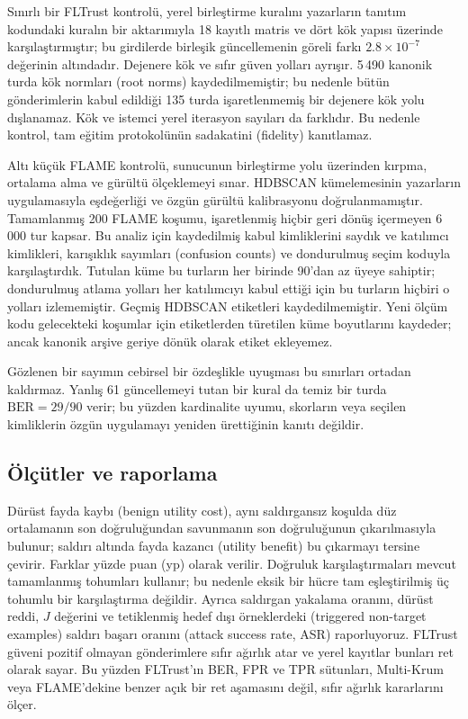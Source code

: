 \documentclass[journal]{IEEEtran}
\newcommand{\BER}{\mathrm{BER}}
\begin{document}
Sınırlı bir FLTrust kontrolü, yerel birleştirme kuralını yazarların tanıtım kodundaki kuralın bir aktarımıyla 18 kayıtlı matris ve dört kök yapısı üzerinde karşılaştırmıştır; bu girdilerde birleşik güncellemenin göreli farkı $2.8\times10^{-7}$ değerinin altındadır. Dejenere kök ve sıfır güven yolları ayrışır. 5\,490 kanonik turda kök normları (root norms) kaydedilmemiştir; bu nedenle bütün gönderimlerin kabul edildiği 135 turda işaretlenmemiş bir dejenere kök yolu dışlanamaz. Kök ve istemci yerel iterasyon sayıları da farklıdır. Bu nedenle kontrol, tam eğitim protokolünün sadakatini (fidelity) kanıtlamaz.

Altı küçük FLAME kontrolü, sunucunun birleştirme yolu üzerinden kırpma, ortalama alma ve gürültü ölçeklemeyi sınar. HDBSCAN kümelemesinin yazarların uygulamasıyla eşdeğerliği ve özgün gürültü kalibrasyonu doğrulanmamıştır. Tamamlanmış 200 FLAME koşumu, işaretlenmiş hiçbir geri dönüş içermeyen 6\,000 tur kapsar. Bu analiz için kaydedilmiş kabul kimliklerini saydık ve katılımcı kimlikleri, karışıklık sayımları (confusion counts) ve dondurulmuş seçim koduyla karşılaştırdık. Tutulan küme bu turların her birinde 90'dan az üyeye sahiptir; dondurulmuş atlama yolları her katılımcıyı kabul ettiği için bu turların hiçbiri o yolları izlememiştir. Geçmiş HDBSCAN etiketleri kaydedilmemiştir. Yeni ölçüm kodu gelecekteki koşumlar için etiketlerden türetilen küme boyutlarını kaydeder; ancak kanonik arşive geriye dönük olarak etiket ekleyemez.

Gözlenen bir sayımın cebirsel bir özdeşlikle uyuşması bu sınırları ortadan kaldırmaz. Yanlış 61 güncellemeyi tutan bir kural da temiz bir turda $\BER=29/90$ verir; bu yüzden kardinalite uyumu, skorların veya seçilen kimliklerin özgün uygulamayı yeniden ürettiğinin kanıtı değildir.

\subsection{Ölçütler ve raporlama}
Dürüst fayda kaybı (benign utility cost), aynı saldırgansız koşulda düz ortalamanın son doğruluğundan savunmanın son doğruluğunun çıkarılmasıyla bulunur; saldırı altında fayda kazancı (utility benefit) bu çıkarmayı tersine çevirir. Farklar yüzde puan (yp) olarak verilir. Doğruluk karşılaştırmaları mevcut tamamlanmış tohumları kullanır; bu nedenle eksik bir hücre tam eşleştirilmiş üç tohumlu bir karşılaştırma değildir. Ayrıca saldırgan yakalama oranını, dürüst reddi, $J$ değerini ve tetiklenmiş hedef dışı örneklerdeki (triggered non-target examples) saldırı başarı oranını (attack success rate, ASR) raporluyoruz. FLTrust güveni pozitif olmayan gönderimlere sıfır ağırlık atar ve yerel kayıtlar bunları ret olarak sayar. Bu yüzden FLTrust'ın BER, FPR ve TPR sütunları, Multi-Krum veya FLAME'dekine benzer açık bir ret aşamasını değil, sıfır ağırlık kararlarını ölçer.
\end{document}
